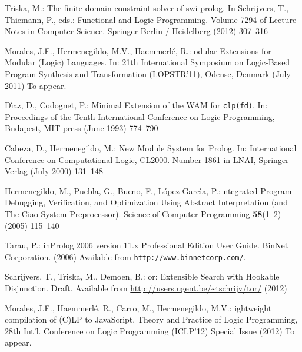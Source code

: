 \documentclass{llncs}
\begin{document}
\begin{thebibliography}{10}
Triska, M.:
\newblock The finite domain constraint solver of swi-prolog.
\newblock In Schrijvers, T., Thiemann, P., eds.: Functional and Logic
  Programming. Volume 7294 of Lecture Notes in Computer Science.
\newblock Springer Berlin / Heidelberg (2012)  307--316

Morales, J.F., Hermenegildo, M.V., Haemmerl\'{e}, R.:
odular {E}xtensions for {M}odular ({L}ogic) {L}anguages.
\newblock In: 21th International Symposium on Logic-Based Program Synthesis and
  Transformation (LOPSTR'11), Odense, Denmark (July 2011) To appear.

D\'{\i}az, D., Codognet, P.:
 {M}inimal {E}xtension of the {WAM} for {\tt clp(fd)}.
\newblock In: Proceedings of the Tenth International Conference on Logic
  Programming, Budapest, MIT press (June 1993)  774--790

Cabeza, D., Hermenegildo, M.:
 {N}ew {M}odule {S}ystem for {P}rolog.
\newblock In: International Conference on Computational Logic, CL2000. Number
  1861 in LNAI, Springer-Verlag (July 2000)  131--148

Hermenegildo, M., Puebla, G., Bueno, F., L\'{o}pez-Garc\'{\i}a, P.:
ntegrated {P}rogram {D}ebugging, {V}erification, and
  {O}ptimization {U}sing {A}bstract {I}nterpretation (and {T}he {C}iao {S}ystem
  {P}reprocessor).
\newblock Science of Computer Programming \textbf{58}(1--2) (2005)  115--140

Tarau, P.:
in{P}rolog 2006 version 11.x {P}rofessional {E}dition {U}ser
  {G}uide.
\newblock BinNet Corporation. (2006) Available from
  \texttt{http://www.binnetcorp.com/}.

Schrijvers, T., Triska, M., Demoen, B.:
or: {E}xtensible {S}earch with {H}ookable {D}isjunction.
\newblock Draft. Available from \url{http://users.ugent.be/~tschrijv/tor/}
  (2012)

Morales, J.F., Haemmerl\'{e}, R., Carro, M., Hermenegildo, M.V.:
ightweight compilation of {(C)LP} to {J}ava{S}cript.
\newblock Theory and Practice of Logic Programming, 28th Int'l. Conference on
  Logic Programming (ICLP'12) Special Issue (2012) To appear.

\end{thebibliography}
\end{document}
